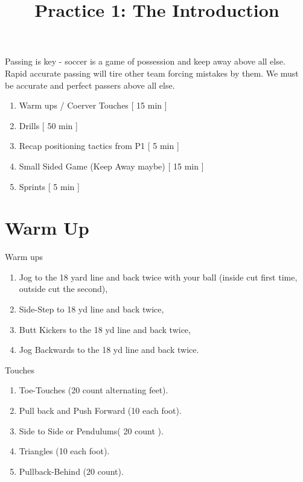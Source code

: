 \documentclass[10pt,letterpaper]{article}
\title{Practice 1: The Introduction}
\author{}
\date{}
\newenvironment{agendablock}[1]{%
    \tcolorbox[beamer,%
    noparskip,breakable,
    colback=LightGray,colframe=DarkGray,%
    colbacklower=Gray!75!LightGray,%
    title=#1]}%
    {\endtcolorbox}
\newenvironment{myalertblock}[1]{%
    \tcolorbox[beamer,%
    noparskip,breakable,
    colback=LightCoral,colframe=DarkRed,%
    colbacklower=Tomato!75!LightCoral,%
    title=#1]}%
    {\endtcolorbox}
\begin{document}
\selectfont
\maketitle

\begin{agendablock}{Practice Activities}
    Passing is key - soccer is a game of possession and keep away above all else.  Rapid accurate passing will tire other team forcing mistakes by them.  We must be accurate and perfect passers above all else. 
    \begin{enumerate}
        \item Warm ups / Coerver Touches [ 15 min ]
        \item Drills [ 50 min ]
        \item Recap positioning tactics from P1 [ 5 min ]
        \item Small Sided Game (Keep Away maybe) [ 15 min ]
        \item Sprints [ 5 min ] 
    \end{enumerate}
\end{agendablock}

\section{Warm Up}

\begin{myalertblock}{Warm ups / Coerver Touches (15 min) }
    Warm ups
    \begin{enumerate}
        \item Jog to the 18 yard line and back twice with your ball (inside cut first time, outside cut the second),
        \item Side-Step to 18 yd line and back twice,
        \item Butt Kickers to the 18 yd line and back twice,
        \item Jog Backwards to the 18 yd line and back twice.
    \end{enumerate}
    Touches
    \begin{enumerate}
        \item Toe-Touches (20 count alternating feet).
        \item Pull back and Push Forward (10 each foot).
        \item Side to Side or Pendulums( 20 count ).
        \item Triangles (10 each foot).
        \item Pullback-Behind (20 count).
    \end{enumerate}
\end{myalertblock}
\end{document}
